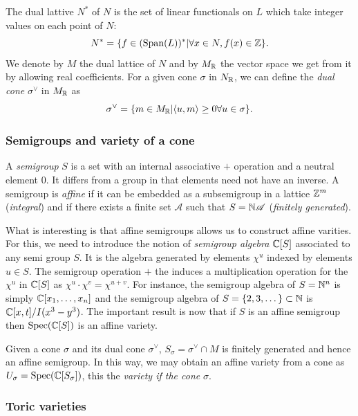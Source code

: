             The dual lattive $N^*$ of $N$ is the set of linear functionals on $L$ which take integer values on each point of $N$:
            \begin{equation}
                N^*=\{f\in(\text{Span}(L))^*|\forall x\in N,f(x)\in\mathbb{Z}\}.
            \end{equation}
            We denote by $M$ the dual lattice of $N$ and by $M_{\mathbb{R}}$ the vector space we get from it by allowing real coefficients. For a given cone $\sigma$ in $ N_{\mathbb{R}}$, we can define the \emph{dual cone} $\sigma^\vee$ in $M_{\mathbb{R}}$ as
            \begin{equation}
                \sigma^\vee=\{m\in M_{\mathbb{R}}|\langle u,m\rangle\geq0 \forall u\in\sigma\}.
            \end{equation}
            
        \subsubsection{Semigroups and variety of a cone}

            A \emph{semigroup} $S$ is a set with an internal associative $+$ operation and a neutral element $0$. It differs from a group in that elements need not have an inverse. A semigroup is \emph{affine} if it can be embedded as a subsemigroup in a lattice $\mathbb{Z}^m$ (\emph{integral}) and if there exists a finite set $\mathscr{A}$ such that $S=\mathbb{N}\mathscr{A}$ (\emph{finitely generated}). 
            
            What is interesting is that affine semigroups allows us to construct affine varities. For this, we need to introduce the notion of \emph{semigroup algebra} $\mathbb{C}[S]$ associated to any semi group $S$. It is the algebra generated by elements $\chi^u$ indexed by elements $u\in S$. The semigroup operation $+$ the induces a multiplication operation for the $\chi^u$ in $\mathbb{C}[S]$ as $\chi^u\cdot\chi^v=\chi^{u+v}$. For instance, the semigroup algebra of $S=\mathbb{N}^n$ is simply $\mathbb{C}[x_1,\dots,x_n]$ and the semigroup algebra of $S=\{2,3,\dots\}\subset\mathbb{N}$ is $\mathbb{C}[x,t]/I(x^3-y^3)$. The important result is now that if $S$ is an affine semigroup then $\text{Spec}(\mathbb{C}[S])$ is an affine variety.

            Given a cone $\sigma$ and its dual cone $\sigma^\vee$, $S_\sigma=\sigma^\vee\cap M$ is finitely generated and hence an affine semigroup. In this way, we may obtain an affine variety from a cone as $U_\sigma=\text{Spec}(\mathbb{C}[S_\sigma])$, this the \emph{variety if the cone} $\sigma$.

        \subsubsection{Toric varieties}

